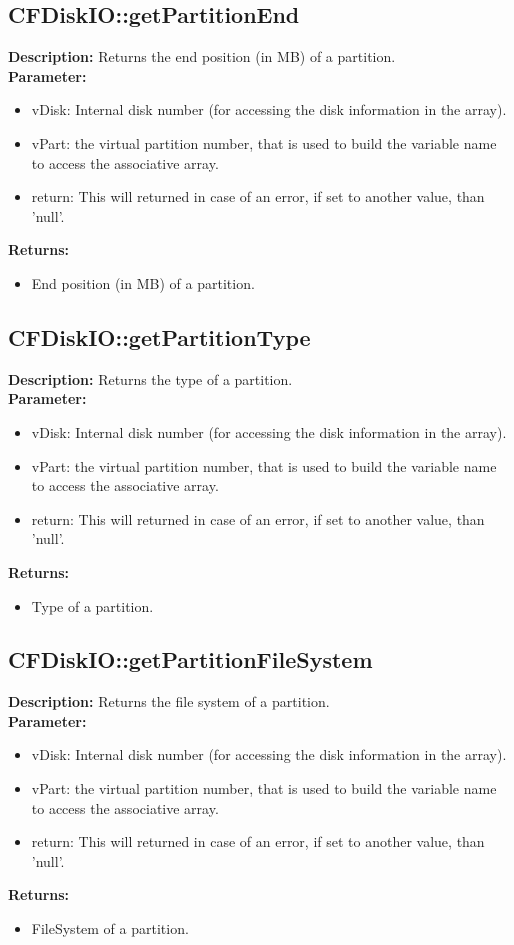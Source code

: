 \subsection{CFDiskIO::getPartitionEnd}
\textbf{Description:} Returns the end position (in MB) of a partition.\\
\textbf{Parameter:}
\begin{itemize}
\item vDisk: Internal disk number (for accessing the disk information in the array).
\item vPart: the virtual partition number, that is used to build the variable name to access the associative array.
\item return: This will returned in case of an error, if set to another value, than 'null'.
\end{itemize}
\textbf{Returns:}
\begin{itemize}
\item End position (in MB) of a partition.
\end{itemize}

\subsection{CFDiskIO::getPartitionType}
\textbf{Description:} Returns the type of a partition.\\
\textbf{Parameter:}
\begin{itemize}
\item vDisk: Internal disk number (for accessing the disk information in the array).
\item vPart: the virtual partition number, that is used to build the variable name to access the associative array.
\item return: This will returned in case of an error, if set to another value, than 'null'.
\end{itemize}
\textbf{Returns:}
\begin{itemize}
\item Type of a partition.
\end{itemize}

\subsection{CFDiskIO::getPartitionFileSystem}
\textbf{Description:} Returns the file system of a partition.\\
\textbf{Parameter:}
\begin{itemize}
\item vDisk: Internal disk number (for accessing the disk information in the array).
\item vPart: the virtual partition number, that is used to build the variable name to access the associative array.
\item return: This will returned in case of an error, if set to another value, than 'null'.
\end{itemize}
\textbf{Returns:}
\begin{itemize}
\item FileSystem of a partition.
\end{itemize}

